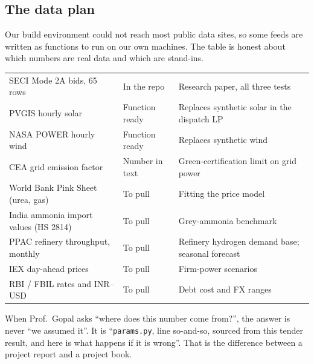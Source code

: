 \subsection{The data plan}
Our build environment could not reach most public data sites, so some feeds are written as functions to run on our own machines. The table is honest about which numbers are real data and which are stand-ins.

\begin{center}\tablefont
\begin{tabularx}{\textwidth}{@{}P{38mm} P{22mm} L@{}}
\toprule
{} &  & \\ \midrule
SECI Mode 2A bids, 65 rows \cite{seci2025} & In the repo & Research paper, all three tests\\
PVGIS hourly solar \cite{pvgis} & Function ready & Replaces synthetic solar in the dispatch LP\\
NASA POWER hourly wind \cite{nasapower} & Function ready & Replaces synthetic wind\\
CEA grid emission factor \cite{cea2026} & Number in text & Green-certification limit on grid power\\
World Bank Pink Sheet (urea, gas) & To pull & Fitting the price model\\
India ammonia import values (HS 2814) & To pull & Grey-ammonia benchmark\\
PPAC refinery throughput, monthly & To pull & Refinery hydrogen demand base; seasonal forecast\\
IEX day-ahead prices & To pull & Firm-power scenarios\\
RBI / FBIL rates and INR--USD & To pull & Debt cost and FX ranges\\
\bottomrule
\end{tabularx}
\end{center}

\begin{plainwords}
When Prof.\ Gopal asks ``where does this number come from?'', the answer is never ``we assumed it''. It is ``\texttt{params.py}, line so-and-so, sourced from this tender result, and here is what happens if it is wrong''. That is the difference between a project report and a project book.
\end{plainwords}
\newpage
